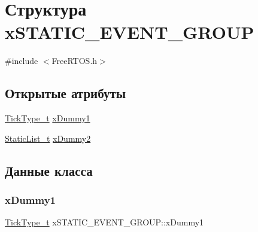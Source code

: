 \hypertarget{structx_s_t_a_t_i_c___e_v_e_n_t___g_r_o_u_p}{}\section{Структура x\+S\+T\+A\+T\+I\+C\+\_\+\+E\+V\+E\+N\+T\+\_\+\+G\+R\+O\+UP}
\label{structx_s_t_a_t_i_c___e_v_e_n_t___g_r_o_u_p}


{\ttfamily \#include $<$Free\+R\+T\+O\+S.\+h$>$}

\subsection*{Открытые атрибуты}
\begin{DoxyCompactItemize}
\item 
\mbox{\hyperlink{portmacro_8h_aa69c48c6e902ce54f70886e6573c92a9}{Tick\+Type\+\_\+t}} \mbox{\hyperlink{structx_s_t_a_t_i_c___e_v_e_n_t___g_r_o_u_p_a4ed0094f715dd8f79a354f42fd973fc6}{x\+Dummy1}}
\item 
\mbox{\hyperlink{_free_r_t_o_s_8h_a9735ad9101a2bd25f83a62089a4acee6}{Static\+List\+\_\+t}} \mbox{\hyperlink{structx_s_t_a_t_i_c___e_v_e_n_t___g_r_o_u_p_a17d070c972ecd0151d7505a539653551}{x\+Dummy2}}
\end{DoxyCompactItemize}


\subsection{Данные класса}
\mbox{\label{structx_s_t_a_t_i_c___e_v_e_n_t___g_r_o_u_p_a4ed0094f715dd8f79a354f42fd973fc6}} 
\subsubsection{\texorpdfstring{xDummy1}{xDummy1}}
{\footnotesize\ttfamily \mbox{\hyperlink{portmacro_8h_aa69c48c6e902ce54f70886e6573c92a9}{Tick\+Type\+\_\+t}} x\+S\+T\+A\+T\+I\+C\+\_\+\+E\+V\+E\+N\+T\+\_\+\+G\+R\+O\+U\+P\+::x\+Dummy1}

\mbox{\label{structx_s_t_a_t_i_c___e_v_e_n_t___g_r_o_u_p_a17d070c972ecd0151d7505a539653551}} 
